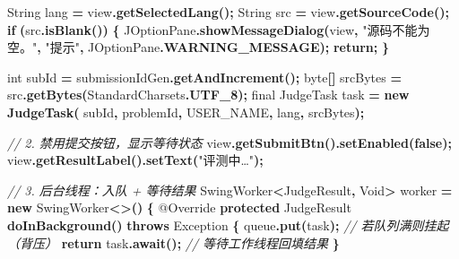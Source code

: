\documentclass[
  11pt,
]{ctexart}
\newenvironment{Shaded}{\begin{snugshade}}{\end{snugshade}}
\newcommand{\AttributeTok}[1]{\textcolor[rgb]{0.13,0.29,0.53}{#1}}
\newcommand{\BuiltInTok}[1]{#1}
\newcommand{\CommentTok}[1]{\textcolor[rgb]{0.56,0.35,0.01}{\textit{#1}}}
\newcommand{\ControlFlowTok}[1]{\textcolor[rgb]{0.13,0.29,0.53}{\textbf{#1}}}
\newcommand{\DataTypeTok}[1]{\textcolor[rgb]{0.13,0.29,0.53}{#1}}
\newcommand{\FunctionTok}[1]{\textcolor[rgb]{0.13,0.29,0.53}{\textbf{#1}}}
\newcommand{\KeywordTok}[1]{\textcolor[rgb]{0.13,0.29,0.53}{\textbf{#1}}}
\newcommand{\NormalTok}[1]{#1}
\newcommand{\OperatorTok}[1]{\textcolor[rgb]{0.81,0.36,0.00}{\textbf{#1}}}
\newcommand{\StringTok}[1]{\textcolor[rgb]{0.31,0.60,0.02}{#1}}
\begin{document}
\begin{Shaded}
\begin{Highlighting}[]
        \BuiltInTok{String}\NormalTok{ lang }\OperatorTok{=}\NormalTok{ view}\OperatorTok{.}\FunctionTok{getSelectedLang}\OperatorTok{();}
        \BuiltInTok{String}\NormalTok{ src  }\OperatorTok{=}\NormalTok{ view}\OperatorTok{.}\FunctionTok{getSourceCode}\OperatorTok{();}
        \ControlFlowTok{if} \OperatorTok{(}\NormalTok{src}\OperatorTok{.}\FunctionTok{isBlank}\OperatorTok{())} \OperatorTok{\{}
            \BuiltInTok{JOptionPane}\OperatorTok{.}\FunctionTok{showMessageDialog}\OperatorTok{(}\NormalTok{view}\OperatorTok{,} \StringTok{"源码不能为空。"}\OperatorTok{,}
                \StringTok{"提示"}\OperatorTok{,} \BuiltInTok{JOptionPane}\OperatorTok{.}\FunctionTok{WARNING\_MESSAGE}\OperatorTok{);}
            \ControlFlowTok{return}\OperatorTok{;}
        \OperatorTok{\}}

        \DataTypeTok{int}\NormalTok{ subId }\OperatorTok{=}\NormalTok{ submissionIdGen}\OperatorTok{.}\FunctionTok{getAndIncrement}\OperatorTok{();}
        \DataTypeTok{byte}\OperatorTok{[]}\NormalTok{ srcBytes }\OperatorTok{=}\NormalTok{ src}\OperatorTok{.}\FunctionTok{getBytes}\OperatorTok{(}\NormalTok{StandardCharsets}\OperatorTok{.}\FunctionTok{UTF\_8}\OperatorTok{);}
        \DataTypeTok{final}\NormalTok{ JudgeTask task }\OperatorTok{=} \KeywordTok{new} \FunctionTok{JudgeTask}\OperatorTok{(}
\NormalTok{            subId}\OperatorTok{,}\NormalTok{ problemId}\OperatorTok{,}\NormalTok{ USER\_NAME}\OperatorTok{,}\NormalTok{ lang}\OperatorTok{,}\NormalTok{ srcBytes}\OperatorTok{);}

        \CommentTok{// 2. 禁用提交按钮，显示等待状态}
\NormalTok{        view}\OperatorTok{.}\FunctionTok{getSubmitBtn}\OperatorTok{().}\FunctionTok{setEnabled}\OperatorTok{(}\KeywordTok{false}\OperatorTok{);}
\NormalTok{        view}\OperatorTok{.}\FunctionTok{getResultLabel}\OperatorTok{().}\FunctionTok{setText}\OperatorTok{(}\StringTok{"评测中…"}\OperatorTok{);}

        \CommentTok{// 3. 后台线程：入队 + 等待结果}
        \BuiltInTok{SwingWorker}\OperatorTok{\textless{}}\NormalTok{JudgeResult}\OperatorTok{,} \BuiltInTok{Void}\OperatorTok{\textgreater{}}\NormalTok{ worker }\OperatorTok{=} \KeywordTok{new} \BuiltInTok{SwingWorker}\OperatorTok{\textless{}\textgreater{}()} \OperatorTok{\{}
            \AttributeTok{@Override}
            \KeywordTok{protected}\NormalTok{ JudgeResult }\FunctionTok{doInBackground}\OperatorTok{()} \KeywordTok{throws} \BuiltInTok{Exception} \OperatorTok{\{}
\NormalTok{                queue}\OperatorTok{.}\FunctionTok{put}\OperatorTok{(}\NormalTok{task}\OperatorTok{);}     \CommentTok{// 若队列满则挂起（背压）}
                \ControlFlowTok{return}\NormalTok{ task}\OperatorTok{.}\FunctionTok{await}\OperatorTok{();} \CommentTok{// 等待工作线程回填结果}
            \OperatorTok{\}}


\end{Highlighting}
\end{Shaded}
\end{document}
